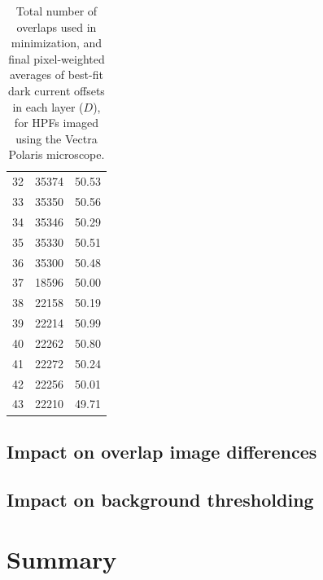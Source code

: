 \documentclass[letterpaper,11pt]{article}
\begin{document}
\begin{table}[!htb]
\begin{tabular}{c c c}
32          & 35374              & 50.53 \\
33          & 35350              & 50.56 \\
34          & 35346              & 50.29 \\
35          & 35330              & 50.51 \\
36          & 35300              & 50.48 \\
37          & 18596              & 50.00 \\
38          & 22158              & 50.19 \\
39          & 22214              & 50.99 \\
40          & 22262              & 50.80 \\
41          & 22272              & 50.24 \\
42          & 22256              & 50.01 \\
43          & 22210              & 49.71 \\
\hline
\end{tabular}
\caption{\footnotesize Total number of overlaps used in minimization, and final pixel-weighted averages of best-fit dark current offsets in each layer ($D$), for HPFs imaged using the Vectra Polaris microscope.}
\label{tab:best_offsets_polaris}
\end{table}

\subsection{Impact on overlap image differences}
\label{ssec:impact_on_overlap_image_differences}

\subsection{Impact on background thresholding}
\label{ssec:impact_on_background_threshold}

\clearpage

\section{Summary}
\label{sec:summary}

\clearpage

\end{document}
